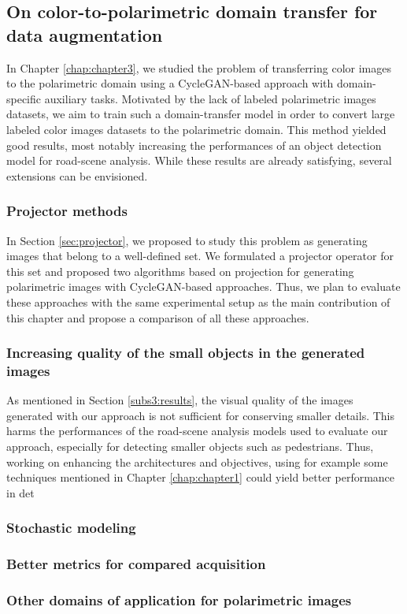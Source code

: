 \subsection*{On color-to-polarimetric domain transfer for data augmentation}

In Chapter \ref{chap:chapter3}, we studied the problem of transferring color images to the polarimetric domain using a CycleGAN-based approach with domain-specific auxiliary tasks. Motivated by the lack of labeled polarimetric images datasets, we aim to train such a domain-transfer model in order to convert large labeled color images datasets to the polarimetric domain.  This method yielded good results, most notably increasing the performances of an object detection model for road-scene analysis. While these results are already satisfying, several extensions can be envisioned.

\subsubsection*{Projector methods}

In Section \ref{sec:projector}, we proposed to study this problem as generating images that belong to a well-defined set. We formulated a projector operator for this set and proposed two algorithms based on projection for generating polarimetric images with CycleGAN-based approaches. Thus, we plan to evaluate these approaches with the same experimental setup as the main contribution of this chapter and propose a comparison of all these approaches.

\subsubsection*{Increasing quality of the small objects in the generated images}

As mentioned in Section \ref{subs3:results}, the visual quality of the images generated with our approach is not sufficient for conserving smaller details. This harms the performances of the road-scene analysis models used to evaluate our approach, especially for detecting smaller objects such as pedestrians. Thus,  working on enhancing the architectures and objectives, using for example some techniques mentioned in Chapter \ref{chap:chapter1} could yield better performance in det

\subsubsection*{Stochastic modeling}

\subsubsection*{Better metrics for compared acquisition}

\subsubsection*{Other domains of application for polarimetric images}
	